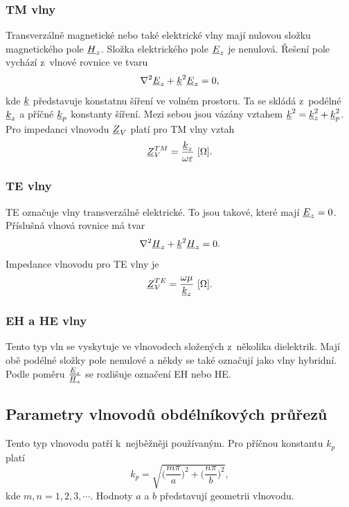 \subsubsection*{TM vlny}
Transverzálně magnetické nebo také elektrické vlny mají nulovou složku magnetického pole ${\underline{H}}_{z}$. Složka elektrického pole ${\underline{E}}_{z}$ je nenulová. Řešení pole vychází z~vlnové rovnice ve tvaru
\begin{displaymath}
	\nabla^{2} {\underline{E}}_{z} + {\underline{k}}^{2}{\underline{E}}_{z} = 0,
\end{displaymath}
kde ${\underline{k}}$ představuje konstatnu šíření ve volném prostoru. Ta se skládá z~podélné ${\underline{k}}_z$ a příčné ${\underline{k}}_p$ konstanty šíření. Mezi sebou jsou vázány vztahem ${\underline{k}}^{2} = {\underline{k}}_z^{2} + {\underline{k}}_p^{2}$. Pro impedanci vlnovodu ${\underline{Z}}_{V}$ platí pro TM vlny vztah
\begin{displaymath}
   {\underline{Z}}_{V}^{TM} = \frac{{\underline{k}}_z}{\omega\varepsilon}\mathrm{\ [\Omega]}.
\end{displaymath}

\subsubsection*{TE vlny}
TE označuje vlny transverzálně elektrické. To jsou takové, které mají ${\underline{E}}_{z} = 0$. Příslušná vlnová rovnice má tvar
\begin{displaymath}
	\nabla^{2} {\underline{H}}_{z} + {\underline{k}}^{2}{\underline{H}}_{z} = 0.
\end{displaymath}
Impedance vlnovodu pro TE vlny je
\begin{displaymath}
	{\underline{Z}}_{V}^{TE} = \frac{\omega\mu}{{\underline{k}}_z}\mathrm{\ [\Omega]}.
\end{displaymath} 
\subsubsection*{EH a HE vlny}
Tento typ vln se vyskytuje ve vlnovodech složených z~několika dielektrik. Mají obě podélné složky pole nenulové a někdy se také označují jako vlny hybridní. Podle poměru $\frac{{\underline{E}}_z}{{\underline{H}}_z}$ se rozlišuje označení EH nebo HE.

\subsection{Parametry vlnovodů obdélníkových průřezů}
Tento typ vlnovodu patří k~nejběžněji používaným. 
Pro příčnou konstantu $k_p$ platí 
\begin{displaymath}
	k_p = \sqrt{\bigg(\frac{m\pi}{a}\bigg)^{2} + \bigg(\frac{n\pi}{b}\bigg)^{2}},
\end{displaymath}
kde $m, n = 1, 2, 3,\cdots$. Hodnoty $a$ a $b$ představují geometrii vlnovodu.

